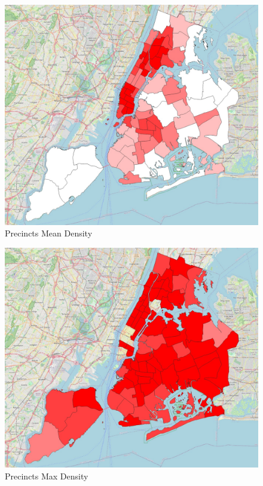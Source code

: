 \documentclass[
  letterpaper,
  DIV=11,
  numbers=noendperiod]{scrreprt}
\begin{document}
\begin{figure}[H]

{\centering \includegraphics{images/lab_13/lab13_fig_precs_mean_density.jpg}

}

\caption{Precincts Mean Density}

\end{figure}%
\begin{figure}[H]

{\centering \includegraphics{images/lab_13/lab13_fig_precs_max_density.jpg}

}

\caption{Precincts Max Density}

\end{figure}%
\end{document}
